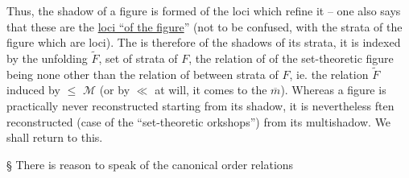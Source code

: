 Thus, the shadow of a figure is formed of the loci which refine it -- one also says that these are the \uline{loci ``of the figure}'' (not to be confused, with the strata of the figure which are loci). The  is therefore  of the shadows of its strata, it is indexed by the unfolding $\widetilde F$, set of strata of $F$, the relation of  of the set-theoretic figure being none other than the relation of  between strata of $F$, ie. the relation  $\widetilde F$ induced by $\leq$  $\mathcal M$ (or by $\ll$ at will, it comes to the $\overline m$). Whereas a figure is practically never reconstructed starting from its shadow, it is nevertheless ften reconstructed (case of the ``set-theoretic orkshops'')  from its multishadow. We shall return to this.

\S{} There is reason to speak of the canonical order relations
